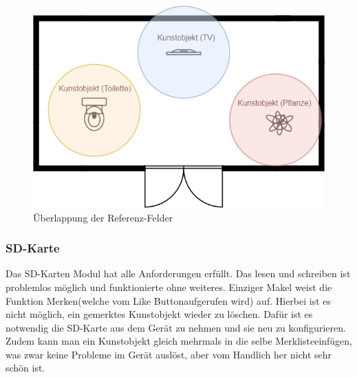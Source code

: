 \begin{figure}[H]
	\begin{center}
		\includegraphics[width=120mm]{data/validierung_software_ref_felder.png}
		\caption[Überlappung der Referenz-Felder]{Überlappung der Referenz-Felder} %
		\label{fig:ref_felder}
	\end{center}
\end{figure}

\subsubsection{SD-Karte}
Das SD-Karten Modul hat alle Anforderungen erfüllt. Das lesen und schreiben ist problemlos möglich und funktionierte ohne weiteres. Einziger Makel weist die Funktion \glqq Merken\grqq (welche vom \glqq Like Button\grqq aufgerufen wird) auf. Hierbei ist es nicht möglich, ein gemerktes Kunstobjekt wieder zu löschen. Dafür ist es notwendig die SD-Karte aus dem Gerät zu nehmen und sie neu zu konfigurieren. Zudem kann man ein Kunstobjekt gleich mehrmals in die selbe \glqq Merkliste\grqq einfügen, was zwar keine Probleme im Gerät auslöst, aber vom Handlich her nicht sehr schön ist.


